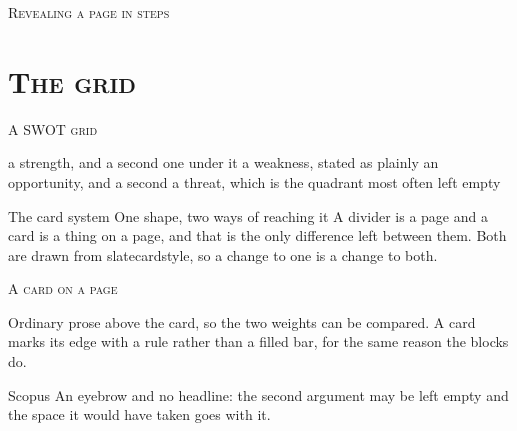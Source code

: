 \documentclass[xcolor=dvipsnames, aspectratio=1610]{beamer}
\begin{document}
\begin{frame}{\textsc{Revealing a page in steps}}

  \begin{itemize}
  \end{itemize}


\end{frame}

\section{\textsc{The grid}}

\begin{frame}{\textsc{A SWOT grid}}

  \swot
    {\scriptsize a strength, and a second one under it}
    {\scriptsize a weakness, stated as plainly}
    {\scriptsize an opportunity, and a second}
    {\scriptsize a threat, which is the quadrant most often left empty}

\end{frame}

\slatedivider
  {The card system}
  {One shape, two ways of reaching it}
  {A divider is a page and a card is a thing on a page, and that is the only
   difference left between them. Both are drawn from slatecardstyle, so a
   change to one is a change to both.}

\begin{frame}{\textsc{A card on a page}}

  Ordinary prose above the card, so the two weights can be compared. A card
  marks its edge with a rule rather than a filled bar, for the same reason the
  blocks do.

  \medskip
  \begin{slatecard}{Scopus}{}
    An eyebrow and no headline: the second argument may be left empty and the
    space it would have taken goes with it.
  \end{slatecard}

\end{frame}
\end{document}
